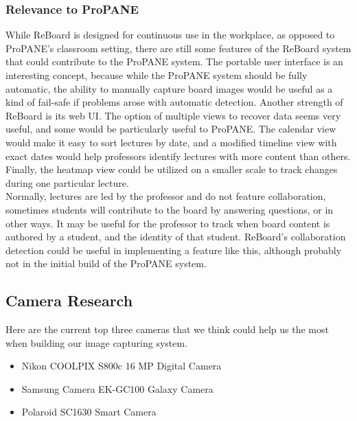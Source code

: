 \documentclass{article}
\begin{document}
	\subsubsection*{Relevance to ProPANE}
While ReBoard is designed for continuous use in the workplace, as opposed to ProPANE's classroom setting, there are still some features of the ReBoard system that could contribute to the ProPANE system.  The portable user interface is an interesting concept, because while the ProPANE system should be fully automatic, the ability to manually capture board images would be useful as a kind of fail-safe if problems arose with automatic detection.  Another strength of ReBoard is its web UI.  The option of multiple views to recover data seems very useful, and some would be particularly useful to ProPANE.  The calendar view would make it easy to sort lectures by date, and a modified timeline view with exact dates would help professors identify lectures with more content than others.  Finally, the heatmap view could be utilized on a smaller scale to track changes during one particular lecture.   \\
\indent Normally, lectures are led by the professor and do not feature collaboration, sometimes students will contribute to the board by answering questions, or in other ways.  It may be useful for the professor to track when board content is authored by a student, and the identity of that student.  ReBoard's collaboration detection could be useful in implementing a feature like this, although probably not in the initial build of the ProPANE system.  \\


  \subsection*{Camera Research}
Here are the current top three cameras that we think could help us the most when building our image capturing system.

\begin{itemize}
    \item Nikon COOLPIX S800c 16 MP Digital Camera \cite{nikon}
   
    \item Samsung Camera EK-GC100 Galaxy Camera \cite{samsung}

    \item Polaroid SC1630 Smart Camera \cite{polaroid}
   
\end{itemize}
\end{document}
